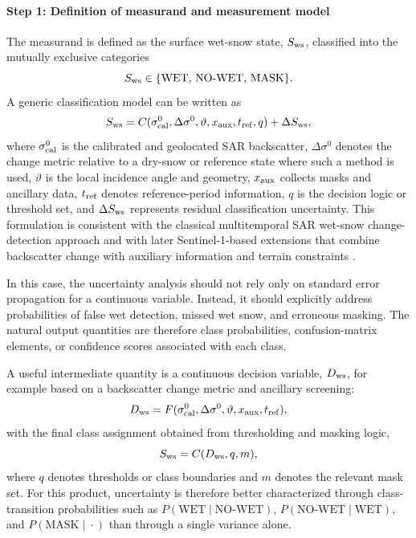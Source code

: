 \paragraph{Step 1: Definition of measurand and measurement model}

The measurand is defined as the surface wet-snow state, $S_{\rm ws}$,
classified into the mutually exclusive categories
\begin{equation}
  S_{\rm ws} \in \{\mathrm{WET},\, \mathrm{NO\mbox{-}WET},\, \mathrm{MASK}\}.
  \label{eq:wetsnow_classes}
\end{equation}
A generic classification model can be written as
\begin{equation}
  S_{\rm ws} = C(\sigma^0_{\rm cal}, \Delta\sigma^0, \vartheta, x_{\rm aux}, t_{\rm ref}, q) + \Delta S_{\rm ws},
  \label{eq:wetsnow_measurement_model}
\end{equation}
where $\sigma^0_{\rm cal}$ is the calibrated and geolocated \ac{SAR}
backscatter, $\Delta\sigma^0$ denotes the change metric relative to a dry-snow
or reference state where such a method is used, $\vartheta$ is the local
incidence angle and geometry, $x_{\rm aux}$ collects masks and ancillary data,
$t_{\rm ref}$ denotes reference-period information, $q$ is the decision logic
or threshold set, and $\Delta S_{\rm ws}$ represents residual classification
uncertainty. This formulation is consistent with the classical multitemporal
SAR wet-snow change-detection approach and with later Sentinel-1-based
extensions that combine backscatter change with auxiliary information and
terrain constraints \cite{nagler00,tsai19}.

\noindent In this case, the uncertainty analysis should not rely only on standard
error propagation for a continuous variable. Instead, it should explicitly
address probabilities of false wet detection, missed wet snow, and erroneous
masking. The natural output quantities are therefore class probabilities,
confusion-matrix elements, or confidence scores associated with each class.

\noindent A useful intermediate quantity is a continuous decision variable,
$D_{\rm ws}$, for example based on a backscatter change metric and ancillary
screening:
\begin{equation}
  D_{\rm ws} = F(\sigma^0_{\rm cal}, \Delta\sigma^0, \vartheta, x_{\rm aux}, t_{\rm ref}),
  \label{eq:wetsnow_decision_variable}
\end{equation}
with the final class assignment obtained from thresholding and masking logic,
\begin{equation}
  S_{\rm ws} = C(D_{\rm ws}, q, m),
  \label{eq:wetsnow_classification_rule}
\end{equation}
where $q$ denotes thresholds or class boundaries and $m$ denotes the relevant
mask set. For this product, uncertainty is therefore better characterized
through class-transition probabilities such as $P(\mathrm{WET}\!\mid\!\mathrm{NO\mbox{-}WET})$,
$P(\mathrm{NO\mbox{-}WET}\!\mid\!\mathrm{WET})$, and $P(\mathrm{MASK}\!\mid\!\cdot)$ than through a
single variance alone.


